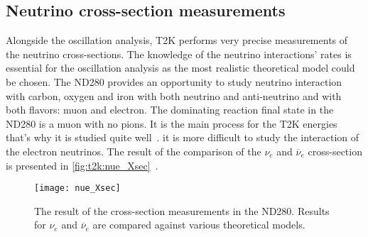 \documentclass[../main.tex]{subfiles}
\begin{document}
\subsection{Neutrino cross-section measurements}
Alongside the oscillation analysis, T2K performs very precise measurements of the neutrino cross-sections. The knowledge of the neutrino interactions' rates is essential for the oscillation analysis as the most realistic theoretical model could be chosen. The ND280 provides an opportunity to study neutrino interaction with carbon, oxygen and iron with both neutrino and anti-neutrino and with both flavors: muon and electron. The dominating reaction final state in the ND280 is a muon with no pions. It is the main process for the T2K energies that's why it is studied quite well~\cite{Abe2020a}. it is more difficult to study the interaction of the electron neutrinos. The result of the comparison of the $\nu_e$ and $\overline{\nu}_e$ cross-section is presented in \autoref{fig:t2k:nue_Xsec}~\cite{Abe2020}.

\begin{figure}[!ht]
  \centering
  \texttt{[image: nue\_Xsec]}
  \caption{The result of the cross-section measurements in the ND280. Results for $\nu_e$ and $\overline{\nu}_e$ are compared against various theoretical models.}
  \label{fig:t2k:nue_Xsec}
\end{figure}
\end{document}
